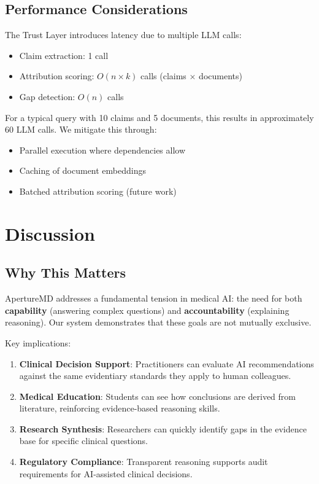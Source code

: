 \documentclass[11pt,a4paper]{article}
\begin{document}
\subsection{Performance Considerations}

The Trust Layer introduces latency due to multiple LLM calls:
\begin{itemize}
    \item Claim extraction: 1 call
    \item Attribution scoring: $O(n \times k)$ calls (claims $\times$ documents)
    \item Gap detection: $O(n)$ calls
\end{itemize}

For a typical query with 10 claims and 5 documents, this results in approximately 60 LLM calls. We mitigate this through:
\begin{itemize}
    \item Parallel execution where dependencies allow
    \item Caching of document embeddings
    \item Batched attribution scoring (future work)
\end{itemize}

\section{Discussion}

\subsection{Why This Matters}

ApertureMD addresses a fundamental tension in medical AI: the need for both \textbf{capability} (answering complex questions) and \textbf{accountability} (explaining reasoning). Our system demonstrates that these goals are not mutually exclusive.

Key implications:

\begin{enumerate}
    \item \textbf{Clinical Decision Support}: Practitioners can evaluate AI recommendations against the same evidentiary standards they apply to human colleagues.
    
    \item \textbf{Medical Education}: Students can see how conclusions are derived from literature, reinforcing evidence-based reasoning skills.
    
    \item \textbf{Research Synthesis}: Researchers can quickly identify gaps in the evidence base for specific clinical questions.
    
    \item \textbf{Regulatory Compliance}: Transparent reasoning supports audit requirements for AI-assisted clinical decisions.
\end{enumerate}
\end{document}
